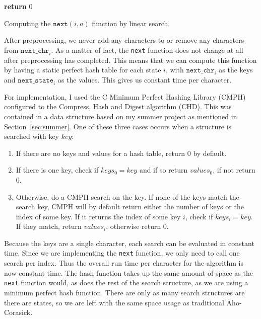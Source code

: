 \documentclass[ %
                    author={Dominic Joseph Moylett},
                    degree={MEng},
                     title={Dictionary Matching with Fingerprints},
                  subtitle={An Empirical Analysis},
                      type={research},
                      year={2015} ]{dissertation}
\begin{document}
\begin{algorithm}[t]
{\bf return} 0
\caption{Computing the $\texttt{next}(i, a)$ function by linear search.}
\label{alg:ac-search}
\end{algorithm}

After preprocessing, we never add any characters to or remove any characters from $\texttt{next\_chr}_i$. As a matter of fact, the \texttt{next} function does not change at all after preprocessing has completed. This means that we can compute this function by having a static perfect hash table for each state $i$, with $\texttt{next\_chr}_i$ as the keys and $\texttt{next\_state}_i$ as the values. This gives us constant time per character.

For implementation, I used the C Minimum Perfect Hashing Library (CMPH) configured to the Compress, Hash and Digest algorithm (CHD). This was contained in a data structure based on my summer project as mentioned in Section~\ref{sec:summer}. One of these three cases occurs when a structure is searched with key $key$:

\begin{enumerate}
  \item If there are no keys and values for a hash table, return 0 by default.
  \item If there is one key, check if $keys_0 = key$ and if so return $values_0$, if not return 0.
  \item Otherwise, do a CMPH search on the key. If none of the keys match the search key, CMPH will by default return either the number of keys or the index of some key. If it returns the index of some key $i$, check if $keys_i = key$. If they match, return $values_i$, otherwise return 0.
\end{enumerate}

Because the keys are a single character, each search can be evaluated in constant time. Since we are implementing the \texttt{next} function, we only need to call one search per index. Thus the overall run time per character for the algorithm is now constant time. The hash function takes up the same amount of space as the \texttt{next} function would, as does the rest of the search structure, as we are using a minimum perfect hash function. There are only as many search structures are there are states, so we are left with the same space usage as traditional Aho-Corasick.
\end{document}
